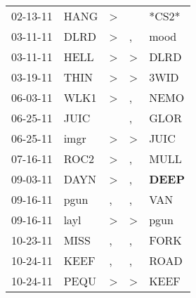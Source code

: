 \begin{supertabular}{p{0.07\textwidth}p{0.06\textwidth}p{0.02\textwidth}p{0.02\textwidth}p{0.06\textwidth}}
          02-13-11\textsuperscript{} &           HANG\textsuperscript{} &     \textgreater &                  &                            *CS2* \\
          03-11-11\textsuperscript{} &           DLRD\textsuperscript{} &     \textgreater &                , &           mood\textsuperscript{} \\
          03-11-11\textsuperscript{} &           HELL\textsuperscript{} &     \textgreater &     \textgreater &           DLRD\textsuperscript{} \\
          03-19-11\textsuperscript{} &           THIN\textsuperscript{} &     \textgreater &     \textgreater &           3WID\textsuperscript{} \\
          06-03-11\textsuperscript{} &           WLK1\textsuperscript{} &     \textgreater &                , &           NEMO\textsuperscript{} \\
          06-25-11\textsuperscript{} &           JUIC\textsuperscript{} &                  &                , &           GLOR\textsuperscript{} \\
          06-25-11\textsuperscript{} &           imgr\textsuperscript{} &     \textgreater &     \textgreater &           JUIC\textsuperscript{} \\
          07-16-11\textsuperscript{} &           ROC2\textsuperscript{} &     \textgreater &                , &           MULL\textsuperscript{} \\
          09-03-11\textsuperscript{} &           DAYN\textsuperscript{} &     \textgreater &                , &  \textbf{DEEP\textsuperscript{}} \\
          09-16-11\textsuperscript{} &           pgun\textsuperscript{} &                , &                , &            VAN\textsuperscript{} \\
          09-16-11\textsuperscript{} &           layl\textsuperscript{} &     \textgreater &     \textgreater &           pgun\textsuperscript{} \\
          10-23-11\textsuperscript{} &           MISS\textsuperscript{} &                , &                , &           FORK\textsuperscript{} \\
          10-24-11\textsuperscript{} &           KEEF\textsuperscript{} &                , &                , &           ROAD\textsuperscript{} \\
          10-24-11\textsuperscript{} &           PEQU\textsuperscript{} &     \textgreater &     \textgreater &           KEEF\textsuperscript{} \\

\end{supertabular}
